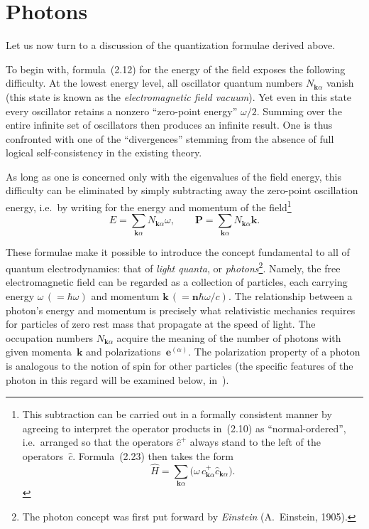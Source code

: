 \section{Photons}

Let us now turn to a discussion of the quantization formulae derived above.

To begin with, formula~(2.12) for the energy of the field exposes the following difficulty. At the lowest energy level,
all oscillator quantum numbers $N_{\mathbf{k}\alpha}$ vanish (this state is known as the \emph{electromagnetic field vacuum}). Yet even in this state every oscillator retains a nonzero ``zero-point energy'' $\omega/2$. Summing over the entire infinite set of oscillators then produces an infinite result. One is thus confronted with one of the ``divergences'' stemming from the absence of full logical self-consistency in the existing theory.

As long as one is concerned only with the eigenvalues of the field energy, this difficulty can be eliminated by simply subtracting away the zero-point oscillation energy, i.e.\ by writing for the energy and momentum of the field\footnote{This subtraction can be carried out in a formally consistent manner by agreeing to interpret the operator products in~(2.10) as ``normal-ordered'', i.e.\ arranged so that the operators $\hat{c}^+$ always stand to the left of the operators~$\hat{c}$. Formula~(2.23) then takes the form
\[
\hat{H} = \sum_{\mathbf{k}\alpha} \bigl(\omega\,\hat{c}^+_{\mathbf{k}\alpha}\hat{c}_{\mathbf{k}\alpha}\bigr).
\]}
\begin{equation}
E = \sum_{\mathbf{k}\alpha} N_{\mathbf{k}\alpha}\omega, \qquad
\mathbf{P} = \sum_{\mathbf{k}\alpha} N_{\mathbf{k}\alpha}\mathbf{k}.
\tag{3.1}
\end{equation}

These formulae make it possible to introduce the concept fundamental to all of quantum electrodynamics: that of \emph{light quanta}, or \emph{photons}\footnote{The photon concept was first put forward by \emph{Einstein} (A.~Einstein, 1905).}. Namely, the free electromagnetic field can be regarded as a collection of particles, each carrying energy $\omega\,(= \hbar\omega)$ and momentum $\mathbf{k}\,(= \mathbf{n}\hbar\omega/c)$. The relationship between a photon's energy and momentum is precisely what relativistic mechanics requires for particles of zero rest mass that propagate at the speed of light. The occupation numbers $N_{\mathbf{k}\alpha}$ acquire the meaning of the number of photons with given momenta~$\mathbf{k}$ and polarizations~$\mathbf{e}^{(\alpha)}$. The polarization property of a photon is analogous to the notion of spin for other particles (the specific features of the photon in this regard will be examined below, in~).

